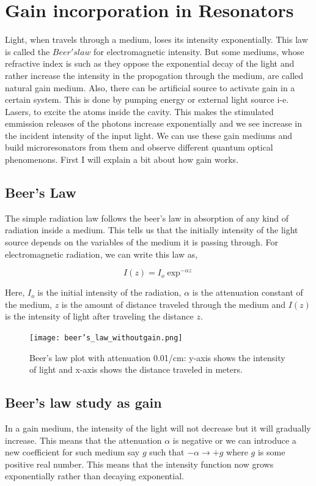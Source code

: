 \section{Gain incorporation in Resonators}
Light, when travels through a medium, loses its intensity exponentially. This law is called the $Beer's law$ for electromagnetic intensity. But some mediums, whose refractive index is such as they oppose the exponential decay of the light and rather increase the intensity in the propogation through the medium, are called natural gain medium. Also, there can be artificial source to activate gain in a certain system. This is done by pumping energy or external light source i-e. Lasers, to excite the atoms inside the cavity. This makes the stimulated emmission releases of the photons increase exponentially and we see increase in the incident intensity of the input light. We can use these gain mediums and build microresonators from them and observe different quantum optical phenomenons. First I will explain a bit about how gain works.


\subsection{Beer's Law}
The simple radiation law follows the beer's law in absorption of any kind of radiation inside a medium. This tells us that the initially intensity of the light source depends on the variables of the medium it is passing through. For electromagnetic radiation, we can write this law as,

\begin{equation}
I(z) = I_{o}\exp^{-\alpha z}
\end{equation}

Here, $I_{o}$ is the initial intensity of the radiation, $\alpha$ is the attenuation constant of the medium, $z$ is the amount of distance traveled through the medium and $I(z)$ is the intensity of light after traveling the distance $z$.

\begin{figure}[h]
\centering
\texttt{[image: beer's\_law\_withoutgain.png]}
\caption{Beer's law plot with attenuation 0.01/cm: y-axis shows the intensity of light and x-axis shows the distance traveled in meters.}
\end{figure}


\subsection{Beer's law study as gain}
In a gain medium, the intensity of the light will not decrease but it will gradually increase. This means that the attenuation $\alpha$ is negative or we can introduce a new coefficient for such medium say $g$ such that $-\alpha \to +g$ where $g$ is some positive real number. This means that the intensity function now grows exponentially rather than decaying exponential.

